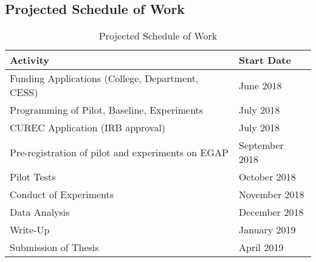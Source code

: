 \documentclass[11pt]{article}
\begin{document}
\subsection{Projected Schedule of Work}
\begin{table}[H]
	\caption{Projected Schedule of Work}
	\begin{tabularx}{\textwidth}{ll}
	\toprule
	Activity & Start Date \\
	\midrule
	Funding Applications (College, Department, CESS) & June 2018 \\
	Programming of Pilot, Baseline, Experiments & July 2018 \\
	CUREC Application (IRB approval) & July 2018 \\
	Pre-registration of pilot and experiments on EGAP & September 2018 \\
	Pilot Tests & October 2018 \\
	Conduct of Experiments & November 2018 \\
	Data Analysis & December 2018 \\
	Write-Up & January 2019 \\
	Submission of Thesis & April 2019 \\
	\bottomrule
	\end{tabularx}
\end{table}
\end{document}
